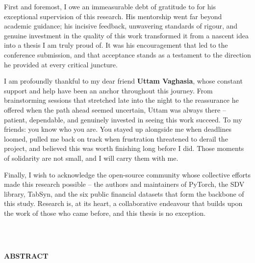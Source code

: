First and foremost, I owe an immeasurable debt of gratitude to \textbf{\guideName} for his exceptional supervision of this research. His mentorship went far beyond academic guidance; his incisive feedback, unwavering standards of rigour, and genuine investment in the quality of this work transformed it from a nascent idea into a thesis I am truly proud of. It was his encouragement that led to the conference submission, and that acceptance stands as a testament to the direction he provided at every critical juncture.

I am profoundly thankful to my dear friend \textbf{Uttam Vaghasia}, whose constant support and help have been an anchor throughout this journey. From brainstorming sessions that stretched late into the night to the reassurance he offered when the path ahead seemed uncertain, Uttam was always there -- patient, dependable, and genuinely invested in seeing this work succeed.
To my friends: you know who you are. You stayed up alongside me when deadlines loomed, pulled me back on track when frustration threatened to derail the project, and believed this was worth finishing long before I did. Those moments of solidarity are not small, and I will carry them with me.

Finally, I wish to acknowledge the open-source community whose collective efforts made this research possible -- the authors and maintainers of PyTorch, the SDV library, TabSyn, and the six public financial datasets that form the backbone of this study. Research is, at its heart, a collaborative endeavour that builds upon the work of those who came before, and this thesis is no exception.

\begin{flushright}
  \textbf{\studentNameone}\\
  \textbf{\enrollmentNumberone}\\
\end{flushright}

\newpage
{}
\begin{center}
  {\LARGE \bf ABSTRACT}\\
\end{center}
\vspace{0.8cm}



